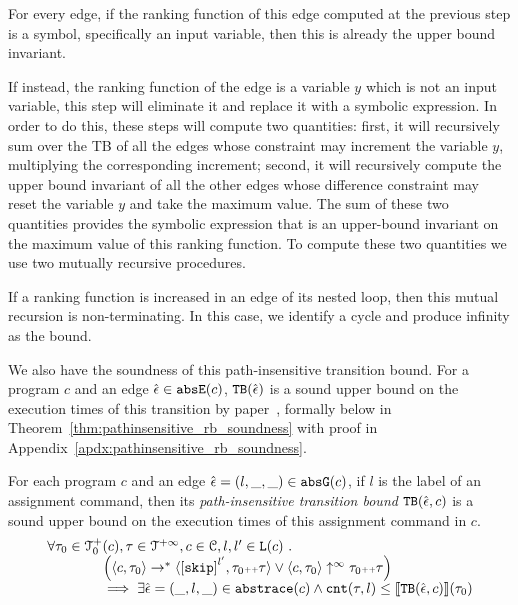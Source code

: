  For every edge, if the ranking function of this edge computed at the previous step is a symbol, specifically an input variable, then this is already the upper bound invariant. 

 If instead, the ranking function of the edge is a variable $y$ which is not an input variable, this step will eliminate it and replace it with a symbolic expression. 
 In order to do this, these steps will compute two quantities: first, it will recursively sum over the TB of all the edges whose constraint may increment the variable $y$, multiplying the corresponding increment; second, it will recursively compute the upper bound invariant of all the other edges whose difference constraint may reset the variable $y$ and take the maximum value. The sum of these two quantities provides the symbolic expression that is an upper-bound invariant on the maximum value of this ranking function. To compute these two quantities we use two mutually recursive procedures.
 
 If a ranking function is increased in an edge of its nested loop, then this mutual recursion is non-terminating. In this case, we identify a cycle and produce infinity as the bound.
 
 
We also have the soundness of this path-insensitive transition bound. For a program $c$ and an edge $\hat{\mathtt{\epsilon}{}} \in \mathtt{abs}{\mathtt{E}}(c)$,
${\mathtt{TB}}(\hat{\mathtt{\epsilon}{}})$ is a sound upper bound
on the execution times of this transition by paper~\cite{SinnZV17}, formally below in Theorem~\ref{thm:pathinsensitive_rb_soundness} with proof in Appendix~\ref{apdx:pathinsensitive_rb_soundness}.
%
\begin{thm}
 \label{thm:pathinsensitive_rb_soundness}
For each program ${c}$ and an edge $\hat{\mathtt{\epsilon}{}} = (l, \_, \_) \in \mathtt{abs}{\mathtt{G}}(c)$, if $l$ is the label of an assignment command,
then its \emph{path-insensitive transition bound} ${\mathtt{TB}}(\hat{\mathtt{\epsilon}{}}, c)$ 
 is a sound upper bound on 
the execution times of this assignment command in $c$.
 \[
 \begin{array}{l}
 \forall \trace_0 \in \ftdom_0(c), \trace \in \tdom, c \in \cdom, l, l' \in \lvar(c) \st
 \\ \qquad \qquad
 \Big( \config{c, \trace_0} \rightarrow^{*} \config{\clabel{\eskip}^{l'}, \trace_0 \tracecat \trace} 
 \lor \config{c, \trace_0} \uparrow^{\infty} \trace_0 \tracecat \trace \Big)
 \\ \qquad \qquad
 \implies
 \exists \absevent = (\_, l, \_) \in \absflow(c) \land
 \counter(\trace, l) \leq \econfig{\absclr(\absevent, c)}(\trace_0)
 \end{array}
 \]
\end{thm}
%
